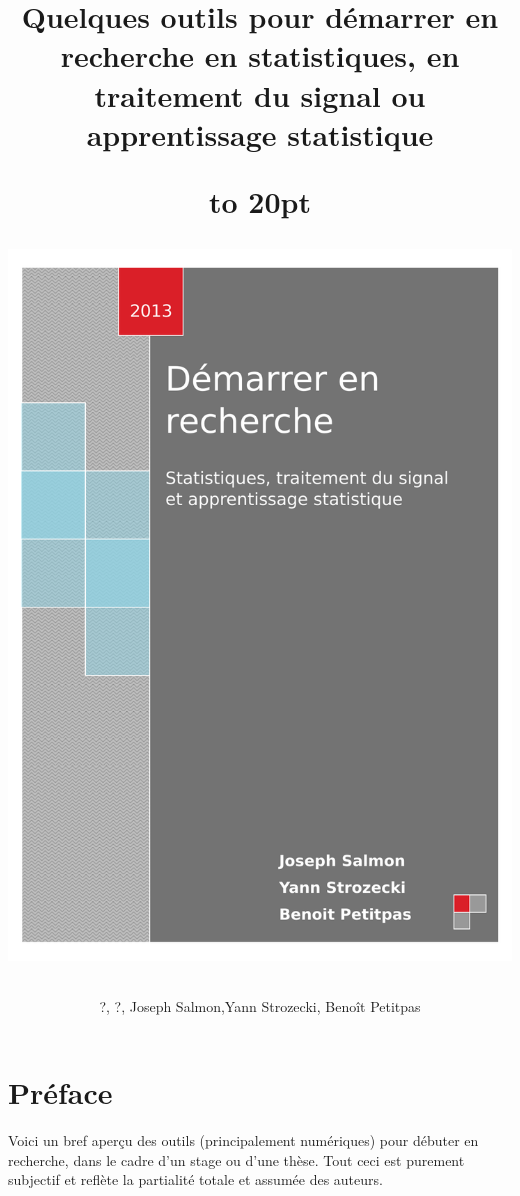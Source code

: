 \documentclass[a4paper,10pt]{book_ad}
\title{Quelques outils pour démarrer en recherche en statistiques, en traitement du signal
ou apprentissage statistique}
\author{?, ?, Joseph Salmon,Yann Strozecki, Benoît Petitpas}
\date {}
\begin{document}
\title{\vbox to 20pt{\vglue-280pt
\centerline{
\includegraphics{images/page-de-garde.pdf}
}
}
}

\author{}
\maketitle
\sloppy

\chapter*{Préface}

Voici un bref aperçu des outils (principalement numériques) pour débuter 
en recherche, dans le cadre d'un stage ou d'une thèse.
Tout ceci est purement subjectif et reflète la partialité totale et assumée des auteurs.
\end{document}
